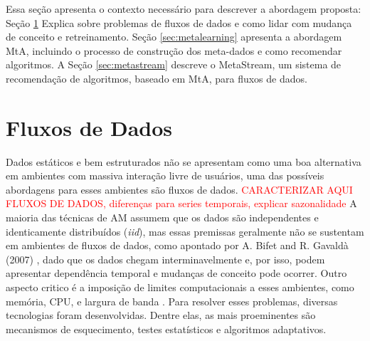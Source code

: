 \newcommand{\texCommand}[1]{\texttt{\textbackslash{#1}}}%

\newcommand{\exemplo}[1]{%
\vspace{\baselineskip}%
\noindent\fbox{\begin{minipage}{\textwidth}#1\end{minipage}}%
\\\vspace{\baselineskip}}%

\newcommand{\exemploVerbatim}[1]{%
\vspace{\baselineskip}%
\noindent\fbox{\begin{minipage}{\textwidth}%
#1\end{minipage}}%
\\\vspace{\baselineskip}}%

Essa seção apresenta o contexto necessário para descrever a abordagem proposta: Seção \ref{sec:datastreams} Explica sobre problemas de fluxos de dados e como lidar com mudança de conceito e retreinamento. 
Seção \ref{sec:metalearning} apresenta a abordagem MtA, incluindo o processo de construção dos meta-dados e como recomendar algoritmos. 
A Seção \ref{sec:metastream} descreve o MetaStream, um sistema de recomendação de algoritmos, baseado em MtA, para fluxos de dados.

\section{Fluxos de Dados}
\label{sec:datastreams}
Dados estáticos e bem estruturados não se apresentam como uma boa alternativa em ambientes com massiva interação livre de usuários, uma das possíveis abordagens para esses ambientes são fluxos de dados.
\textcolor{red}{CARACTERIZAR AQUI FLUXOS DE DADOS, diferenças para series temporais, explicar sazonalidade}
A maioria das técnicas de AM assumem que os dados são independentes e identicamente distribuídos (\textit{iid}),
mas essas premissas geralmente não se sustentam em ambientes de fluxos de dados, como apontado por A. Bifet and R. Gavald\`a (2007) \cite{bifet2007learning},
dado que os dados chegam interminavelmente e, por isso, podem apresentar dependência temporal e mudanças de conceito pode ocorrer.
Outro aspecto critico é a imposição de limites computacionais a esses ambientes, como memória, CPU, e largura de banda \cite{bifet2010moa, gama2012survey}.
Para resolver esses problemas, diversas tecnologias foram desenvolvidas. Dentre elas, as mais proeminentes são mecanismos de esquecimento, testes estatísticos e algoritmos adaptativos.


